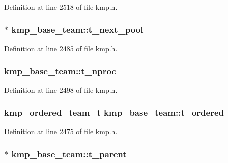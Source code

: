 Definition at line 2518 of file kmp.\-h.

\hypertarget{structkmp__base__team_a7d4909be691ca96c74445fa3bfd75ff2}{
\subsubsection[{t\-\_\-next\-\_\-pool}]{$\ast$ kmp\-\_\-base\-\_\-team\-::t\-\_\-next\-\_\-pool}}\label{structkmp__base__team_a7d4909be691ca96c74445fa3bfd75ff2}


Definition at line 2485 of file kmp.\-h.

\hypertarget{structkmp__base__team_aa3a50b68eb22e0e1e54862b5778b3339}{
\subsubsection[{t\-\_\-nproc}]{ kmp\-\_\-base\-\_\-team\-::t\-\_\-nproc}}\label{structkmp__base__team_aa3a50b68eb22e0e1e54862b5778b3339}


Definition at line 2498 of file kmp.\-h.

\hypertarget{structkmp__base__team_af706f747e4270b26eddd3cc6d55226dc}{
\subsubsection[{t\-\_\-ordered}]{ {\bf kmp\-\_\-ordered\-\_\-team\-\_\-t} kmp\-\_\-base\-\_\-team\-::t\-\_\-ordered}}\label{structkmp__base__team_af706f747e4270b26eddd3cc6d55226dc}


Definition at line 2475 of file kmp.\-h.

\hypertarget{structkmp__base__team_a89a8b8d8f8291f69ab6fdab0d811f6ad}{
\subsubsection[{t\-\_\-parent}]{$\ast$ kmp\-\_\-base\-\_\-team\-::t\-\_\-parent}}\label{structkmp__base__team_a89a8b8d8f8291f69ab6fdab0d811f6ad}


